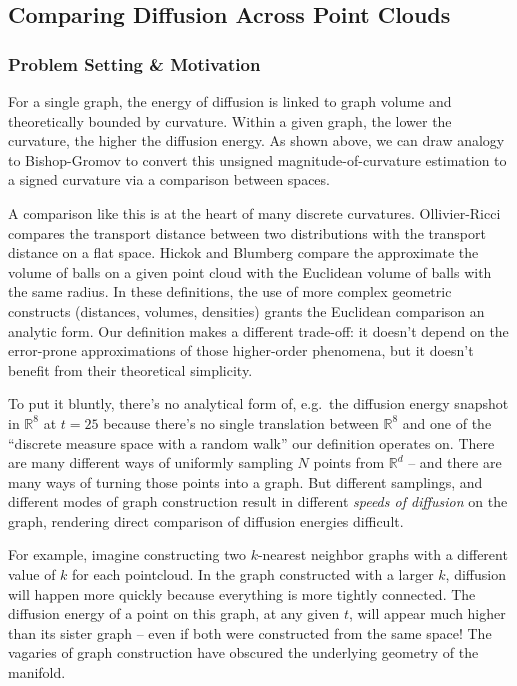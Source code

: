 \documentclass[
  letterpaper,
  DIV=11,
  numbers=noendperiod]{scrartcl}
\theoremstyle{plain}
\theoremstyle{plain}
\theoremstyle{definition}
\theoremstyle{plain}
\theoremstyle{definition}
\theoremstyle{plain}
\theoremstyle{remark}
\begin{document}
\subsection{Comparing Diffusion Across Point
Clouds}\label{comparing-diffusion-across-point-clouds}

\subsubsection{Problem Setting \&
Motivation}\label{problem-setting-motivation}

For a single graph, the energy of diffusion is linked to graph volume
and theoretically bounded by curvature. Within a given graph, the lower
the curvature, the higher the diffusion energy. As shown above, we can
draw analogy to Bishop-Gromov to convert this unsigned
magnitude-of-curvature estimation to a signed curvature via a comparison
between spaces.

A comparison like this is at the heart of many discrete curvatures.
Ollivier-Ricci compares the transport distance between two distributions
with the transport distance on a flat space. Hickok and Blumberg compare
the approximate the volume of balls on a given point cloud with the
Euclidean volume of balls with the same radius. In these definitions,
the use of more complex geometric constructs (distances, volumes,
densities) grants the Euclidean comparison an analytic form. Our
definition makes a different trade-off: it doesn't depend on the
error-prone approximations of those higher-order phenomena, but it
doesn't benefit from their theoretical simplicity.

To put it bluntly, there's no analytical form of, e.g.~the diffusion
energy snapshot in \(\mathbb{R}^8\) at \(t=25\) because there's no
single translation between \(\mathbb{R}^8\) and one of the ``discrete
measure space with a random walk'' our definition operates on. There are
many different ways of uniformly sampling \(N\) points from
\(\mathbb{R}^d\) -- and there are many ways of turning those points into
a graph. But different samplings, and different modes of graph
construction result in different \emph{speeds of diffusion} on the
graph, rendering direct comparison of diffusion energies difficult.

For example, imagine constructing two \(k\)-nearest neighbor graphs with
a different value of \(k\) for each pointcloud. In the graph constructed
with a larger \(k\), diffusion will happen more quickly because
everything is more tightly connected. The diffusion energy of a point on
this graph, at any given \(t\), will appear much higher than its sister
graph -- even if both were constructed from the same space! The vagaries
of graph construction have obscured the underlying geometry of the
manifold.
\end{document}
